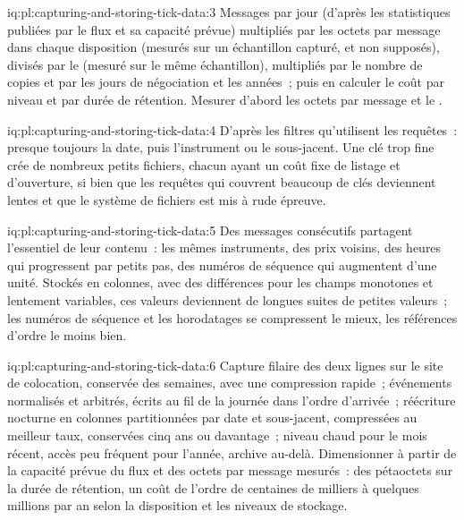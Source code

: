 \begin{solution}{iq:pl:capturing-and-storing-tick-data:3}
Messages par jour (d'après les statistiques publiées par le flux et sa capacité prévue) multipliés par les octets par message dans chaque disposition (mesurés
sur un échantillon capturé, et non supposés), divisés par le  (mesuré sur le même échantillon), multipliés par le nombre de copies et par les jours de
négociation et les années~; puis en calculer le coût par niveau et par durée de rétention. Mesurer d'abord les octets par message et le .
\end{solution}

\begin{solution}{iq:pl:capturing-and-storing-tick-data:4}
D'après les filtres qu'utilisent les requêtes~: presque toujours la date, puis l'instrument ou le sous-jacent. Une clé trop fine crée de nombreux petits fichiers,
chacun ayant un coût fixe de listage et d'ouverture, si bien que les requêtes qui couvrent beaucoup de clés deviennent lentes et que le système de fichiers est mis à rude épreuve.
\end{solution}

\begin{solution}{iq:pl:capturing-and-storing-tick-data:5}
Des messages consécutifs partagent l'essentiel de leur contenu~: les mêmes instruments, des prix voisins, des heures qui progressent par petits pas,
des numéros de séquence qui augmentent d'une unité. Stockés en colonnes, avec des différences pour les champs monotones et lentement variables, ces valeurs deviennent
de longues suites de petites valeurs~; les numéros de séquence et les horodatages se compressent le mieux, les références d'ordre le moins bien.
\end{solution}

\begin{solution}{iq:pl:capturing-and-storing-tick-data:6}
Capture filaire des deux lignes sur le site de colocation, conservée des semaines, avec une compression rapide~; événements normalisés et arbitrés, écrits au fil de la journée
dans l'ordre d'arrivée~; réécriture nocturne en colonnes partitionnées par date et sous-jacent, compressées au meilleur taux, conservées cinq ans ou
davantage~; niveau chaud pour le mois récent, accès peu fréquent pour l'année, archive au-delà. Dimensionner à partir de la capacité prévue du flux et
des octets par message mesurés~: des pétaoctets sur la durée de rétention, un coût de l'ordre de centaines de milliers à quelques millions par an selon
la disposition et les niveaux de stockage.
\end{solution}
